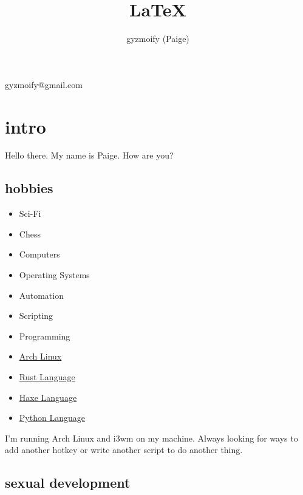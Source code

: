 \documentclass{article}
\makeatletter
\renewcommand{\maketitle}{\begin{center}
{\huge\bfseries
\theauthor}
\vspace{.25em}
gyzmoify@gmail.com
\end{center}
}
\makeatother
\begin{document}
\title{\LaTeX}
\author{gyzmoify (Paige)}

\maketitle

\section{intro}

Hello there.
My name is Paige.
How are you?

\subsection{hobbies}

\begin{itemize}
    \item Sci-Fi
    \item Chess
    \item Computers
    \item Operating Systems
    \item Automation
    \item Scripting
    \item Programming
    \item \href{https://www.archlinux.org/}{Arch Linux}
    \item \href{https://www.rust-lang.org/}{Rust Language}
    \item \href{https://haxe.org/}{Haxe Language}
    \item \href{https://www.python.org/}{Python Language}
\end{itemize}

I'm running Arch Linux and i3wm on my machine.
Always looking for ways to add another hotkey or write another script to do another thing.

\subsection{sexual development}
\end{document}
